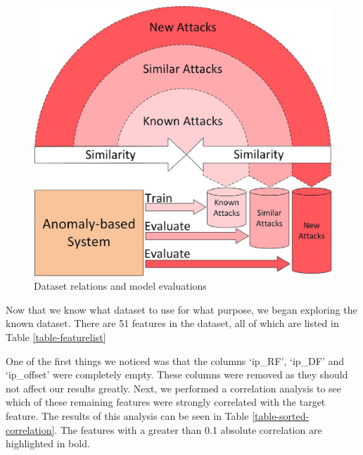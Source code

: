 \documentclass[journal]{IEEEtran}
\begin{document}
\begin{figure}[!htb]
    \centering
    \includegraphics{figures/uploads/known_similar_new_attacks.jpg}
    \caption{Dataset relations and model evaluations}
    \label{figure-known-similar-new}
\end{figure}

Now that we know what dataset to use for what purpose, we began exploring the known dataset. There are 51 features in the dataset, all of which are listed in Table \ref{table-featurelist}



One of the first things we noticed was that the columns `ip\_RF', `ip\_DF' and `ip\_offset' were completely empty. These columns were removed as they should not affect our results greatly. Next, we performed a correlation analysis to see which of these remaining features were strongly correlated with the target feature. The results of this analysis can be seen in Table \ref{table-sorted-correlation}. The features with a greater than 0.1 absolute correlation are highlighted in bold.


\end{document}
